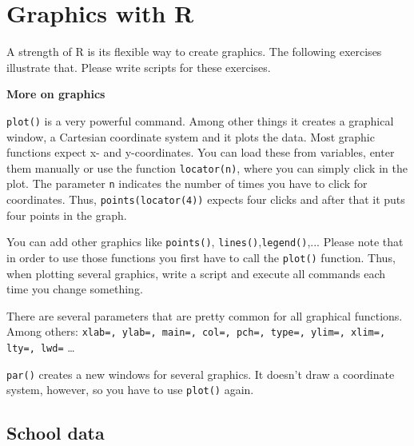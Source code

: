 \documentclass{article}
\begin{document}
\section{Graphics with R \label{graphics}}

A strength of R is its flexible way to create graphics. The following exercises illustrate that. Please write scripts for these exercises.

\begin{solution}
\textbf{More on graphics }

\texttt{plot()} is a very powerful command. Among other things it creates a graphical window, a Cartesian coordinate system and it plots the data. Most graphic functions expect x- and y-coordinates. You can load these from variables, enter them manually or use the function \texttt{locator(n)}, where you can simply click in the plot. The parameter \texttt{n} indicates the number of times you have to click for coordinates. Thus, \texttt{points(locator(4))} expects four clicks and after that it puts four points in the graph.

You can add other graphics like \texttt{points()}, \texttt{lines()},\texttt{legend()},... Please note that in order to use those functions you first have to call the \texttt{plot()} function. Thus, when plotting several graphics, write a script and execute all commands each time you change something.

There are several parameters that are pretty common for all graphical functions. Among others: \texttt{xlab=, ylab=, main=, col=, pch=, type=, ylim=, xlim=, lty=, lwd=} \dots

\texttt{par()} creates a new windows for several graphics. It doesn't draw a coordinate system, however, so you have to use \texttt{plot()} again.
\end{solution}

\subsection{School data}
\end{document}
